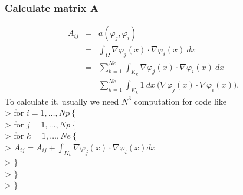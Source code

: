 \documentclass[a4paper,10pt]{article}
\begin{document}
\subsubsection{Calculate matrix $ \mathbf{A}$}
\begin{eqnarray}\nonumber
A_{ij} &=& a(\varphi_{j}, \varphi_{i}) \\ \nonumber
&=& \int_{\Omega} \nabla \varphi_{j}(x) \cdot \nabla \varphi_{i}(x) \ dx \\ \nonumber
&=& \sum_{k=1}^{Ne} \int_{K_{k}} \nabla \varphi_{j}(x) \cdot \nabla \varphi_{i}(x) \ dx \\ \nonumber
&=& \sum_{k=1}^{Ne} \int_{K_{k}} 1 \ dx \ \big( \nabla \varphi_{j}(x) \cdot \nabla \varphi_{i}(x)\big).
\end{eqnarray}
To calculate it, usually we need $ N^3 $ computation for code like \\
\textgreater \hspace{1cm} for $ i=1, \dots, Np \  \{$ \\
\textgreater \hspace{1.5cm} for $ j=1, \dots , Np  \ \{$\\
\textgreater \hspace{2cm} for $ k=1, \dots, Ne \ \{ $  \\
\textgreater \hspace{2.5cm} $ A_{ij} = A_{ij} + \int_{K_{k}} \nabla\varphi_{j}(x) \cdot \nabla \varphi_{i}(x) dx $\\
\textgreater \hspace{2cm} $ \} $ \\
\textgreater \hspace{1.5cm} $ \} $ \\
\textgreater \hspace{1cm} $ \} $
\end{document}

